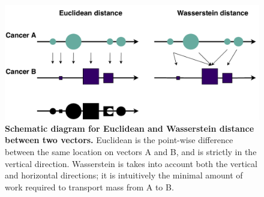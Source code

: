 \begin{figure}[h!]
    \centering
    \includegraphics[scale=0.7]{graphics/wasserstein_demo.pdf}
    \caption{\textbf{Schematic diagram for Euclidean and Wasserstein distance between two vectors.} Euclidean is the point-wise difference between the same location on vectors A and B, and is strictly in the vertical direction. Wasserstein is takes into account both the vertical and horizontal directions; it is intuitively the minimal amount of work required to transport mass from A to B.}
    \label{fig:wasserstein_demo}
\end{figure}
